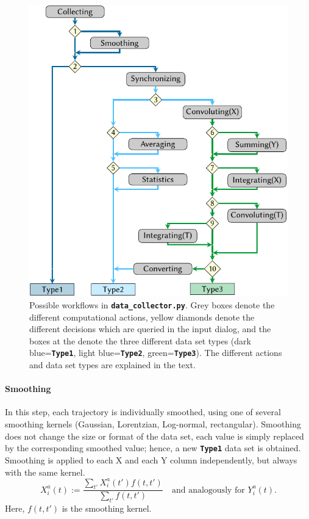 \documentclass[a4paper,10pt,DIV=15,openany]{scrbook}
\newcommand{\todo}[1]{\textcolor{RL}{#1}}
\newcommand{\ttt}[1]{\textbf{\texttt{#1}}}
\begin{document}
\begin{figure}[htb]
  \centering
  \includegraphics[scale=1]{img/data_collector/data_collector.pdf}
  \caption[Possible workflows in \ttt{data\_collector.py}. ]{
  Possible workflows in \ttt{data\_collector.py}. 
  Grey boxes denote the different computational actions, yellow diamonds denote the different decisions which are queried in the input dialog, and the boxes at the denote the three different data set types (dark blue=\ttt{Type1}, light blue=\ttt{Type2}, green=\ttt{Type3}).
  The different actions and data set types are explained in the text.
  }
  \label{fig:data_collector}
\end{figure}

\paragraph{Smoothing}

In this step, each trajectory is individually smoothed, using one of several smoothing kernels (Gaussian, Lorentzian, Log-normal, rectangular). 
Smoothing does not change the size or format of the data set, each value is simply replaced by the corresponding smoothed value; hence, a new \ttt{Type1} data set is obtained.
Smoothing is applied to each X and each Y column independently, but always with the same kernel.
\begin{equation}
  X^a_i(t):=\frac{\sum_{t'}X^a_i(t') f(t,t')}{\sum_{t'}f(t,t')}\quad\text{and analogously for $Y_i^a(t)$.}
\end{equation}
Here, $f(t,t')$ is the smoothing kernel.
\end{document}
